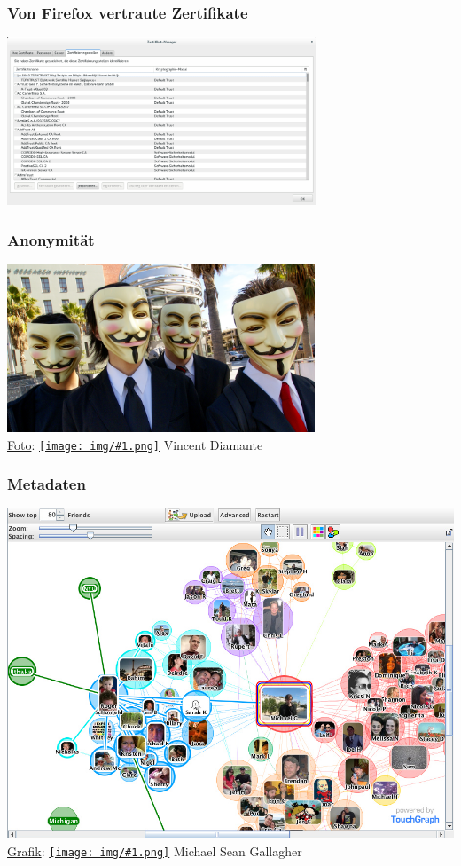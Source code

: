 \documentclass[12pt]{beamer}
\newcommand{\cc}[1]{\texttt{[image: img/\#1.png]}\hspace{1mm}}
\begin{document}
\begin{frame}
    \frametitle{Von Firefox vertraute Zertifikate}
    \begin{center}
      \includegraphics[height=5cm]{img/zertifikate.png}
    \end{center}
\end{frame}

\begin{frame}
    \frametitle{Anonymität}
    \begin{center}
      \includegraphics[height=5cm]{img/anonymous.jpg}
      \\{\small \href{http://www.flickr.com/photos/70857039@N00/2255718951}{Foto}: \href{http://creativecommons.org/licenses/by-sa/2.0/deed.ru}{\cc{by-sa}} Vincent Diamante}
    \end{center}
\end{frame}

\begin{frame}
    \frametitle{Metadaten}
    \includegraphics[height=0.7\textheight]{img/socialgraph.jpg}
    \\{\small \href{http://www.flickr.com/photos/michaelgallagher/5076994408/}{Grafik}: \href{http://creativecommons.org/licenses/by-sa/2.0/}{\cc{by-sa}} Michael Sean Gallagher}
\end{frame}
\end{document}
